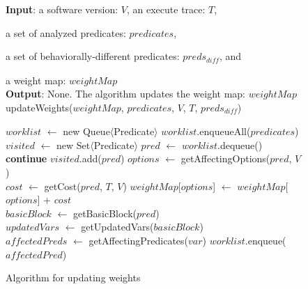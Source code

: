 \begin{figure}[t]
\textbf{Input}: a software version: $\mathit{V}$, an execute trace: $\mathit{T}$, 

\quad a set of analyzed predicates: $\mathit{predicates}$, 

\quad a set of behaviorally-different predicates: $\mathit{preds_{diff}}$, and

\quad a weight map: $\mathit{weightMap}$\\
\textbf{Output}: None. The algorithm updates the weight map: $\mathit{weightMap}$\\
\vspace{-4mm}%
updateWeights($\mathit{weightMap}$, $\mathit{predicates}$, $\mathit{V}$, $\mathit{T}$, $\mathit{preds_{diff}}$)\\
\begin{algorithmic}[1]
\STATE $\mathit{worklist}$ $\leftarrow$ new Queue$\langle$Predicate$\rangle$
\STATE $\mathit{worklist}$.enqueueAll($\mathit{predicates}$)
\STATE $\mathit{visited}$ $\leftarrow$ new Set$\langle$Predicate$\rangle$
\STATE $\mathit{pred}$ $\leftarrow$ $\mathit{worklist}$.dequeue()
\STATE \textbf{continue}
\ENDIF
\STATE $\mathit{visited}$.add($\mathit{pred}$)
\STATE $\mathit{options}$ $\leftarrow$ getAffectingOptions($\mathit{pred}$, $\mathit{V}$)\\
\STATE $\mathit{cost}$ $\leftarrow$ getCost($\mathit{pred}$, $\mathit{T}$, $\mathit{V}$)
\STATE $\mathit{weightMap}$[$\mathit{options}$] $\leftarrow$ $\mathit{weightMap}$[$\mathit{options}$] + $\mathit{cost}$
\ENDFOR\\
\STATE $\mathit{basicBlock}$ $\leftarrow$ getBasicBlock($\mathit{pred}$)\\
\STATE $\mathit{updatedVars}$ $\leftarrow$ getUpdatedVars($\mathit{basicBlock}$)\\
\STATE $\mathit{affectedPreds}$ $\leftarrow$ getAffectingPredicates($\mathit{var}$)
\STATE $\mathit{worklist}$.enqueue($\mathit{affectedPred}$)
\ENDIF
\ENDFOR
\ENDWHILE
\vspace{-2mm}
\end{algorithmic}
\caption{Algorithm for updating weights
\label{fig:update}
}
\end{figure}
